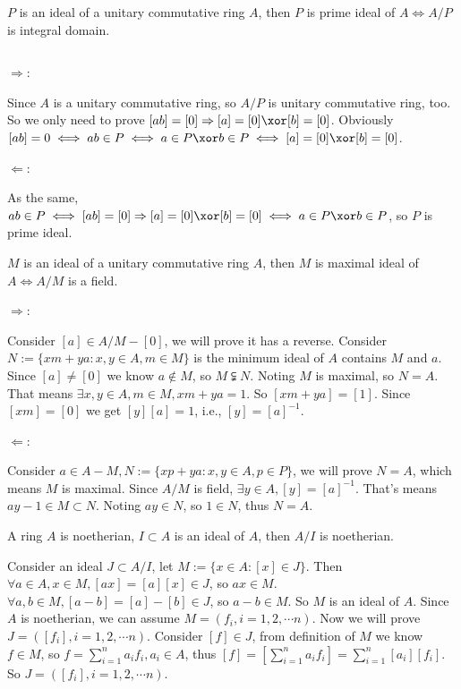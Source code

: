 \documentclass{ctexart}
\newif\ifpreface
\begin{document}
\large
\setlength{\baselineskip}{1.2em}
\ifpreface
  
  \newgeometry{left=2cm,right=2cm,top=2cm,bottom=2cm}
\else
  \maketitle
\fi
\newcommand{\A}{\mathbbm{A}}
\begin{problem}
  $P$ is an ideal of a unitary commutative ring $A$, then $P$ is prime ideal of $A\iff A/P$ is integral domain.
\end{problem}
\(\)
\begin{solution}
  $\Rightarrow $:

  Since $A$ is a unitary commutative ring, so $A/P$ is unitary commutative ring, too. So we only need to prove $[ab]=[0]\Rightarrow [a]=[0]\xor [b]=[0]$.
  Obviously $[ab]=0\iff ab\in P\iff a\in P\xor b\in P\iff [a]=[0]\xor [b]=[0]$.

  $\Leftarrow $:

  As the same, $ab\in P\iff [ab]=[0]\Rightarrow [a]=[0]\xor [b]=[0]\iff a\in P\xor b\in P$, so $P$ is prime ideal.
\end{solution}

\begin{problem}
  $M$ is an ideal of a unitary commutative ring $A$, then $M$ is maximal ideal of $A \iff A/M$ is a field.
\end{problem}
\begin{solution}
  $\Rightarrow $:

  Consider $[a]\in A/M\minus [0]$, we will prove it has a reverse.  Consider $N:=\{xm+ya:x,y\in A,m\in M\}$ is the minimum ideal of $A$ contains $M$ and $a$.
  Since $[a]\neq [0]$ we know $a\notin M$, so $M\subsetneqq N$.
  Noting $M$ is maximal, so $N=A$. That means $\exists x,y\in A,m\in M,xm+ya=1$. So $[xm+ya]=[1]$. Since $[xm]=[0]$ we get $[y][a]=1$, i.e., $[y]=[a]^{-1}$.

  $\Leftarrow $:

  Consider $a\in A\minus M, N:=\{xp+ya:x,y\in A,p\in P\}$, we will prove $N=A$, which means $M$ is maximal.
  Since $A/M$ is field, $\exists y\in A, [y]=[a]^{-1}$. That's means $ay-1\in M\subset N$. Noting $ay\in N$, so $1\in N$, thus $N=A$.
\end{solution}

\begin{problem}
  A ring $A$ is noetherian, $I\subset A$ is an ideal of $A$, then $A/I$ is noetherian.
\end{problem}
\begin{solution}
  Consider an ideal $J\subset A/I$, let $M:=\{x\in A:[x]\in J\}$. Then $\forall a\in A,x\in M,[ax]=[a][x]\in J$, so $ax\in M$. $\forall a,b\in M,[a-b]=[a]-[b]\in J$, so $a-b\in M$. So $M$ is an ideal of $A$.
  Since $A$ is noetherian, we can assume $M=(f_i,i=1,2,\cdots n)$. Now we will prove $J=([f_i],i=1,2,\cdots n)$.
  Consider $[f]\in J$, from definition of $M$ we know $f\in M$, so $f=\sum_{i=1}^na_if_i,a_i\in A$, thus $[f]=\left[\sum_{i=1}^na_if_i\right]=\sum_{i=1}^n[a_i][f_i]$. So $J=([f_i],i=1,2,\cdots n)$.
\end{solution}
\end{document}
